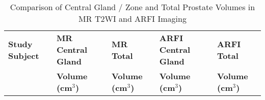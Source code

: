 \begin{table}[h!]
\centering
\caption{Comparison of Central Gland / Zone and Total Prostate Volumes in MR T2WI and ARFI Imaging}
\begin{tabular}{|l|l|l|l|l|} \hline
{\bf Study Subject} & {\bf MR Central Gland} & {\bf MR Total} & {\bf ARFI Central Gland} & {\bf ARFI Total} \\ 
& {\bf Volume (cm$^3$)} & {\bf Volume (cm$^3$)} & {\bf Volume (cm$^3$)} & {\bf Volume (cm$^3$)} \\ \hline

\hline
\end{tabular}
\label{tab:mr_arfi_volumes}
\end{table}
